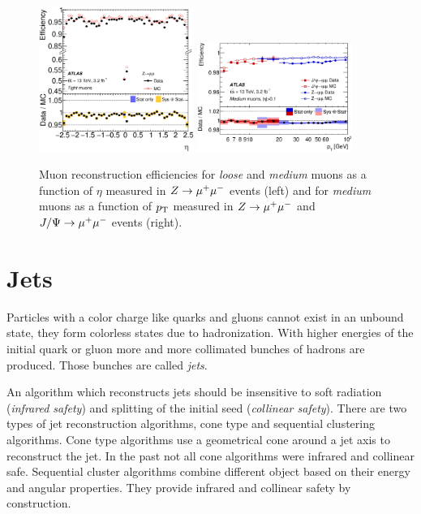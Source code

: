 \begin{figure}[htb]
    \begin{center}
        \includegraphics[width=0.45\textwidth,align=c]{./figures/object_selection/muon_efficiency_mediumloose_zmm.eps}
        \includegraphics[width=0.45\textwidth,align=c]{./figures/object_selection/muon_efficiency_medium_zmmjpsi.eps}
        \caption{Muon reconstruction efficiencies for \emph{loose} and \emph{medium} muons as a function of $\eta$
                measured in $Z \to \mu^+\mu^-$ events (left) and for \emph{medium} muons as a function of $p_\text{T}$ measured in
                $Z \to \mu^+\mu^-$ and $J/\Psi \to \mu^+\mu^-$ events (right).~\cite{PERF-2015-10}}\label{fig:object_selection:mu_id_eff}
    \end{center}
\end{figure}


\section{Jets}\label{sec:object_selection:jets}

Particles with a color charge like quarks and gluons cannot exist in an unbound state,
they form colorless states due to hadronization.
With higher energies of the initial quark or gluon more and more collimated bunches of hadrons are produced.
Those bunches are called \emph{jets}.

An algorithm which reconstructs jets should be insensitive to soft radiation (\emph{infrared safety})
and splitting of the initial seed (\emph{collinear safety}).
There are two types of jet reconstruction algorithms, cone type and sequential clustering algorithms.
Cone type algorithms use a geometrical cone around a jet axis to reconstruct the jet. In the past not
all cone algorithms were infrared and collinear safe.
Sequential cluster algorithms combine different object based on their energy and angular properties.
They provide infrared and collinear safety by construction.

